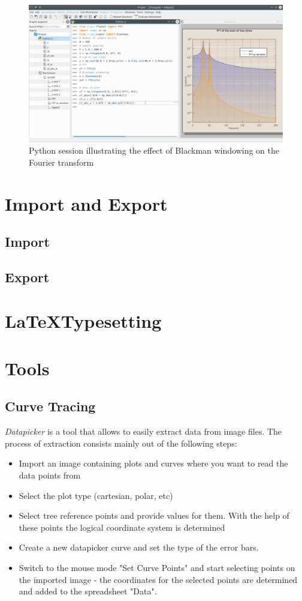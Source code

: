 \begin{figure}
\includegraphics[width=\textwidth]{images/python_session.png}
\caption{Python session illustrating the effect of Blackman windowing on the Fourier transform}
\end{figure}



\chapter{Import and Export}\label{ch:import_export}
\section{Import}\label{sec:import}
\section{Export}\label{sec:export}

\chapter{\LaTeX Typesetting}\label{ch:latex_typesetting}

\chapter{Tools}\label{ch:tools}
\section{Curve Tracing}\label{sec:curve_tracing}
\textit{Datapicker} is a tool that allows to easily extract data from image files. The process of extraction consists mainly out of the following steps:
\begin{itemize}
\item Import an image containing plots and curves where you want to read the data points from
\item Select the plot type (cartesian, polar, etc) 
\item Select tree reference points and provide values for them. With the help of these points the logical coordinate system is determined
\item Create a new datapicker curve and set the type of the error bars.
\item Switch to the mouse mode "Set Curve Points" and start selecting points on the imported image - the coordinates for the selected points are determined and added to the spreadsheet "Data".
\end{itemize}


